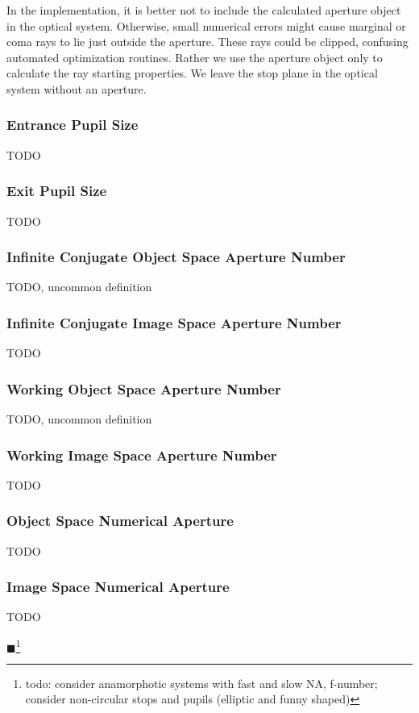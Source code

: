 \documentclass[12pt,a4paper,twoside,openright,BCOR10mm,headsepline,titlepage,abstracton,chapterprefix,final]{scrreprt}
\newcommand{\remark}[1]{{\color{red}$\blacksquare$}\footnote{{\color{red}#1}}}
\begin{document}
In the implementation, it is better not to include the calculated aperture object in the optical system.
Otherwise, small numerical errors might cause marginal or coma rays to lie just outside the aperture.
These rays could be clipped, confusing automated optimization routines.
Rather we use the aperture object only to calculate the ray starting properties.
We leave the stop plane in the optical system without an aperture.


\subsubsection{Entrance Pupil Size}
TODO

\subsubsection{Exit Pupil Size}
TODO

\subsubsection{Infinite Conjugate Object Space Aperture Number}
TODO, uncommon definition

\subsubsection{Infinite Conjugate Image Space Aperture Number}
TODO

\subsubsection{Working Object Space Aperture Number}
TODO, uncommon definition

\subsubsection{Working Image Space Aperture Number}
TODO

\subsubsection{Object Space Numerical Aperture}
TODO

\subsubsection{Image Space Numerical Aperture}
TODO

\remark{todo: consider anamorphotic systems with fast and slow NA, f-number; consider non-circular stops and pupils (elliptic and funny shaped)}
\end{document}
